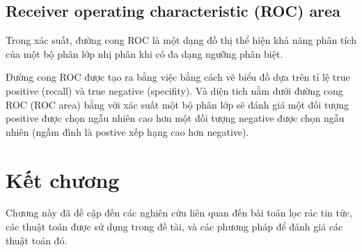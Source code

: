 \subsection{Receiver operating characteristic (ROC) area}
Trong  xác suất, đường cong ROC là một dạng đồ thị thể hiện khả năng phân tích của một bộ phân lớp nhị phân khi có đa dạng ngưỡng phân biệt.

Đường cong ROC được tạo ra bằng việc bằng cách vẽ biểu đồ dựa trên tỉ lệ true positive (recall) và true negative (specifity). Và diện tich nằm dưới đường cong ROC (ROC area) bằng với xác suất một bộ phân lớp sẽ đánh giá một đối tượng positive được chọn ngẫu nhiên cao hơn một đối tượng negative được chọn ngẫu nhiên (ngầm đình là postive xếp hạng cao hơn negative)\cite{Fawcett:2006:IRA:1159473.1159475}.

\section{Kết chương}
Chương này đã đề cập đến các nghiên cứu liên quan đến bài toán lọc rác tin tức, các thuật toán được sử dụng trong đề tài, và các phương pháp để đánh giá các thuật toán đó.